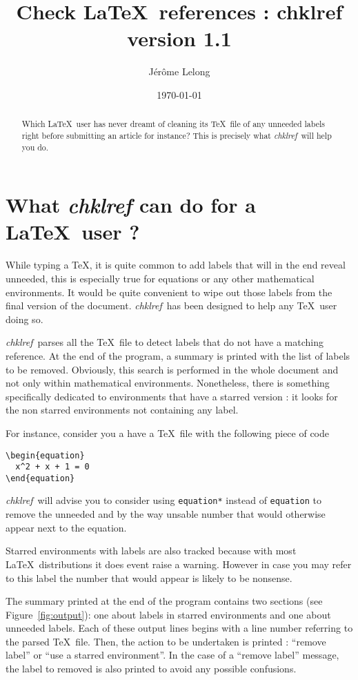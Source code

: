 \documentclass[a4paper,11pt,twoside]{article}
\title{Check \LaTeX\ references : chklref\\
{\large version 1.1}}
\date{\today}
\author{J\'er\^ome Lelong}
\def\chk{{\it chklref}}
\def\page{}%
\def\page{\HCode{<div id='page'>}}%
\begin{document}
\page
\maketitle

\begin{abstract} Which \LaTeX\ user has never dreamt of cleaning its \TeX\ file
  of any unneeded labels right before submitting an article for instance? This
  is precisely what \chk\ will help you do.
\end{abstract}

\section{What {\it chklref} can do for a \LaTeX\ user ?}

While typing a \TeX, it is quite common to add labels that will in the end
reveal unneeded, this is especially true for equations or any other mathematical
environments. It would be quite convenient to wipe out those labels from the
final version of the document. \chk\ has been designed to help any \TeX\
user doing so.

\chk\ parses all the \TeX\ file to detect labels that do not have a matching
reference. At the end of the program, a summary is printed with the list of
labels to be removed. Obviously, this search is performed in the whole document
and not only within mathematical environments. Nonetheless, there is something
specifically dedicated to environments that have a starred version : it looks
for the non starred environments not containing any label.

For instance, consider you a have a \TeX\ file with the following piece of code
\begin{verbatim}
\begin{equation}
  x^2 + x + 1 = 0
\end{equation}
\end{verbatim}
\chk\ will advise you to consider using \verb!equation*! instead of
\verb!equation! to remove the unneeded and by the way unsable number that would
otherwise appear next to the equation.

Starred environments with labels are also tracked because with most \LaTeX\
distributions it does event raise a warning. However in case you may refer to
this label the number that would appear is likely to be nonsense.

The summary printed at the end of the program contains two sections (see
Figure~\ref{fig:output}): one about labels in starred environments and one about
unneeded labels. Each of these output lines begins with a line number referring
to the parsed \TeX\ file. Then, the action to be undertaken is printed :
``remove label'' or ``use a starred environment''. In the case of a ``remove
label'' message, the label to removed is also printed to avoid any possible
confusions.
\end{document}
